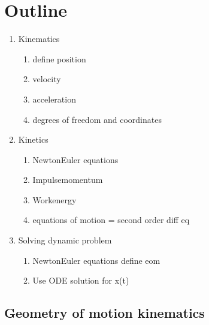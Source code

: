 \documentclass[letterpaper,10pt,english]{sphinxmanual}
\begin{document}
\section{Outline}
\label{\detokenize{module_01/overview:outline}}\begin{enumerate}
%
\item {} 
Kinematics
\begin{enumerate}
%
\item {} 
define position

\item {} 
velocity

\item {} 
acceleration

\item {} 
degrees of freedom and coordinates

\end{enumerate}

\item {} 
Kinetics
\begin{enumerate}
%
\item {} 
Newton\sphinxhyphen{}Euler equations

\item {} 
Impulse\sphinxhyphen{}momentum

\item {} 
Work\sphinxhyphen{}energy

\item {} 
equations of motion = second order diff eq

\end{enumerate}

\item {} 
Solving dynamic problem
\begin{enumerate}
%
\item {} 
Newton\sphinxhyphen{}Euler equations define eom

\item {} 
Use ODE solution for x(t)

\end{enumerate}

\end{enumerate}


\subsection{Geometry of motion \sphinxhyphen{} kinematics}
\label{\detokenize{module_01/kinematics:geometry-of-motion-kinematics}}\label{\detokenize{module_01/kinematics::doc}}
\end{document}
